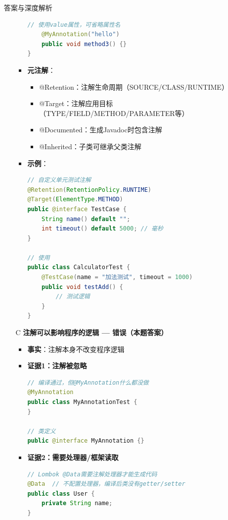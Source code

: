 \documentclass[12pt, a4paper]{ctexart}
\begin{document}
\begin{enumerate}[label=\textbf{\arabic*.}]
\begin{bluebox}{答案与深度解析}
\begin{itemize}[leftmargin=*, nosep, label={}]
\begin{itemize}[label={}, leftmargin=*, nosep]
\begin{lstlisting}[language=Java]
    // 使用value属性，可省略属性名
    @MyAnnotation("hello")
    public void method3() {}
}
				            \end{lstlisting}
				            \item \textbf{元注解}：
				                  \begin{itemize}[label={}, nosep]
					                  \item @Retention：注解生命周期（SOURCE/CLASS/RUNTIME）
					                  \item @Target：注解应用目标（TYPE/FIELD/METHOD/PARAMETER等）
					                  \item @Documented：生成Javadoc时包含注解
					                  \item @Inherited：子类可继承父类注解
				                  \end{itemize}
				            \item \textbf{示例}：
				                  \begin{lstlisting}[language=Java]
// 自定义单元测试注解
@Retention(RetentionPolicy.RUNTIME)
@Target(ElementType.METHOD)
public @interface TestCase {
    String name() default "";
    int timeout() default 5000; // 毫秒
}

// 使用
public class CalculatorTest {
    @TestCase(name = "加法测试", timeout = 1000)
    public void testAdd() {
        // 测试逻辑
    }
}
				            \end{lstlisting}
			            \end{itemize}

			      \item[C] \textbf{注解可以影响程序的逻辑 — 错误（本题答案）}
			            \begin{itemize}[label={}, leftmargin=*, nosep]
				            \item \textbf{事实}：注解本身不改变程序逻辑
				            \item \textbf{证据1：注解被忽略}
				                  \begin{lstlisting}[language=Java]
// 编译通过，但@MyAnnotation什么都没做
@MyAnnotation
public class MyAnnotationTest {
}

// 类定义
public @interface MyAnnotation {}
				            \end{lstlisting}
				            \item \textbf{证据2：需要处理器/框架读取}
				                  \begin{lstlisting}[language=Java]
// Lombok @Data需要注解处理器才能生成代码
@Data  // 不配置处理器，编译后类没有getter/setter
public class User {
    private String name;
}


\end{lstlisting}
\end{itemize}
\end{itemize}
\end{bluebox}
\end{enumerate}
\end{document}
